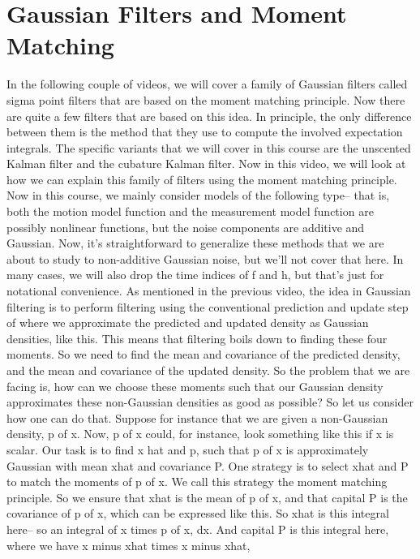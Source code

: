 \section{Gaussian Filters and Moment Matching}
\label{gaussian_filters_and_moment_matching}


In the following couple of videos,
we will cover a family of Gaussian filters called
sigma point filters that are based on the moment matching
principle.
Now there are quite a few filters
that are based on this idea.
In principle, the only difference between them
is the method that they use to compute the involved
expectation integrals.
The specific variants that we will cover in this course
are the unscented Kalman filter and the cubature Kalman filter.
Now in this video, we will look at how
we can explain this family of filters using the moment
matching principle.
Now in this course, we mainly consider
models of the following type--
that is, both the motion model function and the measurement
model function are possibly nonlinear functions,
but the noise components are additive and Gaussian.
Now, it's straightforward to generalize these methods
that we are about to study to non-additive Gaussian noise,
but we'll not cover that here.
In many cases, we will also drop the time indices of f and h,
but that's just for notational convenience.
As mentioned in the previous video,
the idea in Gaussian filtering is
to perform filtering using the conventional prediction
and update step of where we approximate the predicted
and updated density as Gaussian densities, like this.
This means that filtering boils down
to finding these four moments.
So we need to find the mean and covariance
of the predicted density, and the mean and covariance
of the updated density.
So the problem that we are facing is,
how can we choose these moments such
that our Gaussian density approximates
these non-Gaussian densities as good as possible?
So let us consider how one can do that.
Suppose for instance that we are given
a non-Gaussian density, p of x.
Now, p of x could, for instance, look something like this
if x is scalar.
Our task is to find x hat and p, such that p of x
is approximately Gaussian with mean xhat
and covariance P. One strategy is
to select xhat and P to match the moments of p of x.
We call this strategy the moment matching principle.
So we ensure that xhat is the mean
of p of x, and that capital P is the covariance of p of x, which
can be expressed like this.
So xhat is this integral here-- so an integral of x times
p of x, dx.
And capital P is this integral here,
where we have x minus xhat times x minus xhat,
